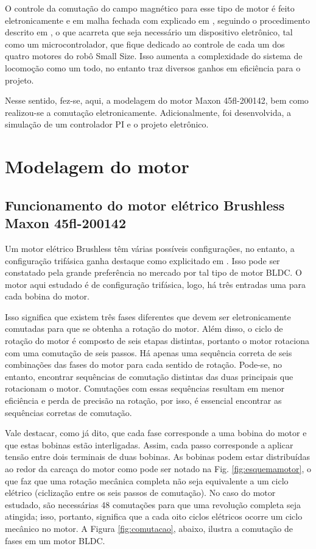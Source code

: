 \documentclass[10pt,fleqn,a4paper]{article}
\begin{document}
    O controle da comutação do campo magnético para esse tipo de motor é feito eletronicamente e em malha fechada com explicado em \cite{ogata1982engenharia}, seguindo o procedimento descrito em \cite{introducaobldc}, o que acarreta que seja necessário um dispositivo eletrônico, tal como um microcontrolador, que fique dedicado ao controle de cada um dos quatro motores do robô Small Size. Isso aumenta a complexidade do sistema de locomoção como um todo, no entanto traz diversos ganhos em eficiência para o projeto.
    
    Nesse sentido, fez-se, aqui, a modelagem do motor Maxon 45fl-200142, bem como realizou-se a comutação eletronicamente. Adicionalmente, foi desenvolvida, a simulação de um controlador PI e o projeto eletrônico.
    
    \section{Modelagem do motor}
    \subsection{Funcionamento do motor elétrico Brushless Maxon 45fl-200142}
    
    Um motor elétrico Brushless têm várias possíveis configurações, no entanto, a configuração trifásica ganha destaque como explicitado em \cite{introducaobldc}. Isso pode ser constatado pela grande preferência no mercado por tal tipo de motor BLDC. O motor aqui estudado é de configuração trifásica, logo, há três entradas uma para cada bobina do motor.
    
    Isso significa que existem três fases diferentes que devem ser eletronicamente comutadas para que se obtenha a rotação do motor. Além disso, o ciclo de rotação do motor é composto de seis etapas distintas, portanto o motor rotaciona com uma comutação de seis passos. Há apenas uma sequência correta de seis combinações das fases do motor para cada sentido de rotação. Pode-se, no entanto, encontrar sequências de comutação distintas das duas principais que rotacionam o motor. Comutações com essas sequências resultam em menor eficiência e perda de precisão na rotação, por isso, é essencial encontrar as sequências corretas de comutação.
    
    Vale destacar, como já dito, que cada fase corresponde a uma bobina do motor e que estas bobinas estão interligadas. Assim, cada passo corresponde a aplicar tensão entre dois terminais de duas bobinas. As bobinas podem estar distribuídas ao redor da carcaça do motor como pode ser notado na Fig. \ref{fig:esquemamotor}, o que faz que uma rotação mecânica completa não seja equivalente a um ciclo elétrico (ciclização entre os seis passos de comutação). No caso do motor estudado, são necessárias 48 comutações para que uma revolução completa seja atingida; isso, portanto, significa que a cada oito ciclos elétricos ocorre um ciclo mecânico no motor. A Figura \ref{fig:comutacao}, abaixo, ilustra a comutação de fases em um motor BLDC.
\end{document}
